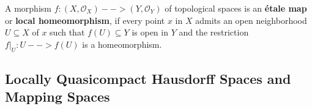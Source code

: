 \begin{lemma}
\end{lemma}

\begin{definition}
	A morphism $f:(X,\mathcal{O}_X) --> (Y,\mathcal{O}_Y)$ of topological spaces is an \textbf{étale map} or \textbf{local homeomorphism}, if every point $x$ in $X$ admits an open neighborhood $U \subseteq X$ of $x$ such that $f(U) \subseteq Y$ is open in $Y$ and the restriction $f\vert_U: U --> f(U)$ is a homeomorphism. 
\end{definition}

\subsection{Locally Quasicompact Hausdorff Spaces and Mapping Spaces}


